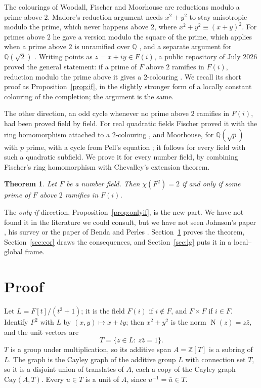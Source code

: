 \documentclass[11pt,a4paper]{amsart}
\newtheorem{theorem}{Theorem}
\theoremstyle{definition}
\newcommand{\Q}{\mathbb{Q}}
\newcommand{\Z}{\mathbb{Z}}
\newcommand{\N}{\operatorname{N}}
\begin{document}
The colourings of Woodall, Fischer and Moorhouse are reductions modulo a prime above $2$. Madore's reduction
argument \cite[Proposition~3.2, \P6.6]{Madore} needs $x^2+y^2$ to stay anisotropic modulo the prime, which never
happens above $2$, where $x^2+y^2\equiv(x+y)^2$. For primes above $2$ he gave a version modulo the square of the
prime, which applies when a prime above $2$ is unramified over $\Q$ \cite[\P3.7, Proposition~3.8]{Madore}, and a separate argument for
$\Q(\sqrt2)$ \cite[Proposition~3.9]{Madore}. Writing points as $z=x+iy\in F(i)$, a public repository of July
2026 \cite{MM} proved the general statement: if a prime of $F$ above $2$ ramifies in $F(i)$, reduction modulo
the prime above it gives a $2$-colouring \cite[Theorem~A$'$]{MM}. We recall its short proof as
Proposition~\ref{prop:if}, in the slightly stronger form of a locally constant colouring of the completion; the
argument is the same.

The other direction, an odd cycle whenever no prime above $2$ ramifies in $F(i)$, had been proved field by field.
For real quadratic fields Fischer proved it with the ring homomorphism attached to a $2$-colouring
\cite[Theorems~1, 7 and~8]{Fischer1990}, and Moorhouse, for $\Q(\sqrt p)$ with $p$ prime, with a cycle from Pell's
equation \cite[Theorem~8.6]{Moorhouse}; it follows for every field with such a quadratic subfield. We prove it for every number field, by combining
Fischer's ring homomorphism with Chevalley's extension theorem.

\begin{theorem}\label{thm:main}
Let $F$ be a number field. Then $\chi(F^2)=2$ if and only if some prime of $F$ above $2$ ramifies in $F(i)$.
\end{theorem}

The \emph{only if} direction, Proposition~\ref{prop:onlyif}, is the new part. We have not found it in the
literature we could consult, but we have not seen Johnson's paper \cite{Johnson1987}, his survey
\cite{Johnson2006} or the paper of Benda and Perles \cite{BP}. Section~\ref{sec:proof} proves the theorem,
Section~\ref{sec:cor} draws the consequences, and Section~\ref{sec:lg} puts it in a local--global frame.

\section{Proof}\label{sec:proof}

Let $L=F[t]/(t^2+1)$; it is the field $F(i)$ if $i\notin F$, and $F\times F$ if $i\in F$. Identify $F^2$ with
$L$ by $(x,y)\mapsto x+ty$; then $x^2+y^2$ is the norm $\N(z)=z\bar z$, and the unit vectors are
\[
T=\{z\in L:\ z\bar z=1\}.
\]
$T$ is a group under multiplication, so its additive span $A=\Z[T]$ is a subring of $L$. The graph is the Cayley
graph of the additive group $L$ with connection set $T$, so it is a disjoint union of translates of $A$, each a copy
of the Cayley graph $\mathrm{Cay}(A,T)$. Every $u\in T$ is a unit of $A$, since $u^{-1}=\bar u\in T$.
\end{document}
